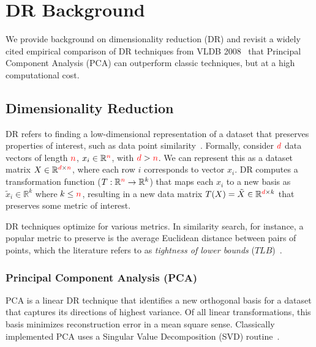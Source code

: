 \section{DR Background}
\label{sec:background}

We provide background on dimensionality reduction (DR) and revisit a widely cited empirical comparison of DR techniques from VLDB 2008~\cite{keogh-study}  that Principal Component Analysis (PCA) can outperform classic techniques, but at a high computational cost.

\subsection{Dimensionality Reduction}
\label{sec:defs}

DR refers to finding a low-dimensional representation of a dataset that preserves properties of interest, such as data point similarity~\cite{dr-survey1,dr-survey2}.
Formally, consider ${\color{red}d}$ data vectors of length ${\color{red}n}$, $x_i \in \mathbb{R}^{\color{red}n}$, with ${\color{red}d} > {\color{red}n}$. 
We can represent this as a dataset matrix $X \in \mathbb{R}^{{\color{red}d} \times {\color{red}n}}$, where each row $i$ corresponds to vector $x_i$.  
DR computes a transformation function ($T: \mathbb{R}^{\color{red}n} \rightarrow \mathbb{R}^k$) that maps each $x_i$ to a new basis as $\tilde{x}_i \in \mathbb{R}^k$ where $k \leq {\color{red}n}$, resulting in a new data matrix $T(X) = \tilde{X} \in \mathbb{R}^{{\color{red}d} \times k}$ that preserves some metric of interest.  

DR techniques optimize for various metrics. 
In similarity search, for instance, a popular metric to preserve is the average Euclidean distance between pairs of points, which the literature refers to as \emph{tightness of lower bounds} ($TLB$)~\cite{gemini,keogh-study}.


\subsubsection*{Principal Component Analysis (PCA)}
\label{sec:pca}
PCA is a linear DR technique that identifies a new orthogonal basis for a dataset that captures its directions of highest variance.
Of all linear transformations, this basis minimizes reconstruction error in a mean square sense. 
Classically implemented PCA uses a Singular Value Decomposition (SVD) routine~\cite{trefethen}.

